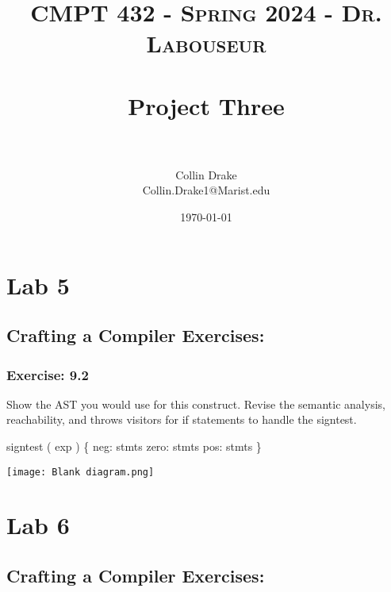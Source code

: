 \documentclass[letterpaper, 10pt,DIV=13]{scrartcl}
\title{	
   \normalfont \normalsize 
   \textsc{CMPT 432 - Spring 2024 - Dr. Labouseur} \\[10pt] %
   \horrule{0.5pt} \\[0.25cm] 	%
   \huge Project Three  \\     	    %
   \horrule{0.5pt} \\[0.25cm] 	%
}
\author{Collin Drake \\ \normalsize Collin.Drake1@Marist.edu}
\date{\normalsize\today} 	%
\numberwithin{equation}{section} %
\numberwithin{figure}{section} %
\numberwithin{table}{section} %
\begin{document}
\maketitle %

\section*{Lab 5}

\subsection*{Crafting a Compiler Exercises:}

\subsubsection*{Exercise: 9.2}
Show the AST you would use for this construct. Revise the semantic analysis, reachability, and throws visitors for if statements to handle the signtest.

signtest ( exp ) \{ \newline
neg: stmts \newline
zero: stmts \newline
pos: stmts \newline
\}

\begin{center}
        \texttt{[image: Blank diagram.png]}
\end{center}





\pagebreak


\section*{Lab 6}


\subsection*{Crafting a Compiler Exercises:}
\end{document}
